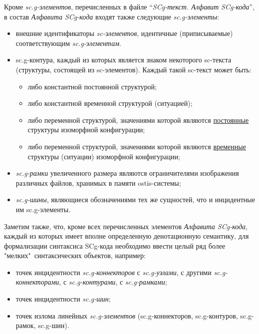 Кроме\textit{ sc.g-элементов}, перечисленных в файле ``\textit{SCg-текст. Алфавит SCg-кода}'', в состав \textit{Алфавита SCg-кода} входят также следующие \textit{sc.g-элементы}:
\begin{itemize}
	\item внешние идентификаторы \textit{sc-элементов}, идентичные (приписываемые) соответствующим \textit{sc.g-элементам}.
	\item sc.g-контура, каждый из которых является знаком некоторого sc-текста (структуры, состоящей из sc-элементов). Каждый такой sc-текст может быть:
	\begin{itemize}
		\item либо константной постоянной структурой;
		\item либо константной временной структурой (ситуацией);
		\item либо переменной структурой, значениями которой являются \uline{постоянные} структуры изоморфной  конфигурации;
		\item либо переменной структурой, значениями которой являются \uline{временные} структуры (ситуации) изоморфной  конфигурации;
	\end{itemize}
	
	\item \textit{sc.g-рамки} увеличенного размера являются ограничителями изображения различных файлов, хранимых в памяти ostis-системы;
	\item \textit{sc.g-шины}, являющиеся обозначениями тех же сущностей, что и инцидентные им sc.g-элементы.
\end{itemize}

Заметим также, что, кроме всех перечисленных элементов \textit{Алфавита SCg-кода}, каждый из которых имеет вполне определенную денотационную  семантику, для формализации синтаксиса SCg-кода необходимо ввести целый ряд более "мелких"\ синтаксических объектов, например:
\begin{itemize}
	\item точек инцидентности \textit{sc.g-коннекторов} с \textit{sc.g-узлами}, с другими \textit{sc.g-коннекторами}, с \textit{sc.g-контурами}, с \textit{sc.g-рамками};
	\item точек инцидентности \textit{sc.g-шин};
	\item точек излома линейных \textit{sc.g-элементов} (sc.g-коннекторов, sc.g-контуров, sc.g-рамок, sc.g-шин).
\end{itemize}

\newpage

\begin{SCn}
\end{SCn}

